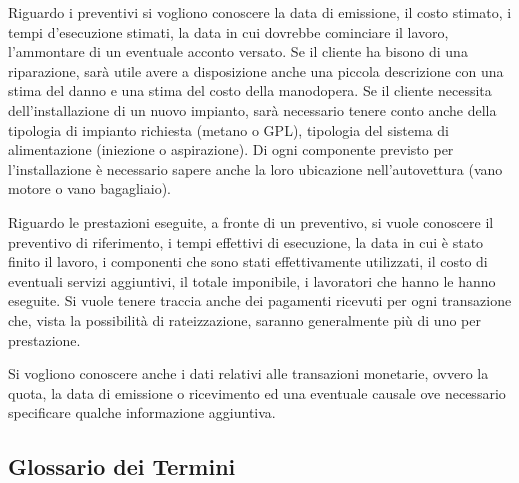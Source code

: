 		Riguardo i preventivi si vogliono conoscere la data di emissione, il costo stimato, i tempi d’esecuzione stimati, la data in cui dovrebbe cominciare il lavoro, l’ammontare di un eventuale acconto versato. Se il cliente ha bisono di una riparazione, sarà utile avere a disposizione anche una piccola descrizione con una stima del danno e una stima del costo della manodopera. Se il cliente necessita dell’installazione di un nuovo impianto, sarà necessario tenere conto anche della tipologia di impianto richiesta (metano o GPL), tipologia del sistema di alimentazione (iniezione o aspirazione). Di ogni componente previsto per l’installazione è necessario sapere anche la loro ubicazione nell’autovettura (vano motore o vano bagagliaio). 
		
		Riguardo le prestazioni eseguite, a fronte di un preventivo, si vuole conoscere il preventivo di riferimento, i tempi effettivi di esecuzione, la data in cui è stato finito il lavoro, i componenti che sono stati effettivamente utilizzati, il costo di eventuali servizi aggiuntivi, il totale imponibile, i lavoratori che hanno le hanno eseguite. Si vuole tenere traccia anche dei pagamenti ricevuti per ogni transazione che, vista la possibilità di rateizzazione, saranno generalmente più di uno per prestazione. 
		
		Si vogliono conoscere anche i dati relativi alle transazioni monetarie, ovvero la quota, la data di emissione o ricevimento ed una eventuale causale ove necessario specificare qualche informazione aggiuntiva.
		
	\subsection{Glossario dei Termini}
	
						
